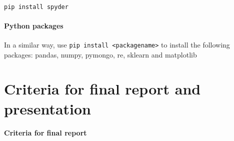 \documentclass[a4paper]{report}
\newcommand{\blankline}{\par\vspace{5mm}}
\begin{document}
\\
{\small\texttt{pip install spyder}}

\paragraph{Python packages}
In a similar way, use {\small\texttt{pip install {\textless}packagename{\textgreater}}} to install the following packages: pandas, numpy, pymongo, re, sklearn and matplotlib 

\blankline

\section*{Criteria for final report and presentation}

\paragraph{Criteria for final report}
\end{document}
